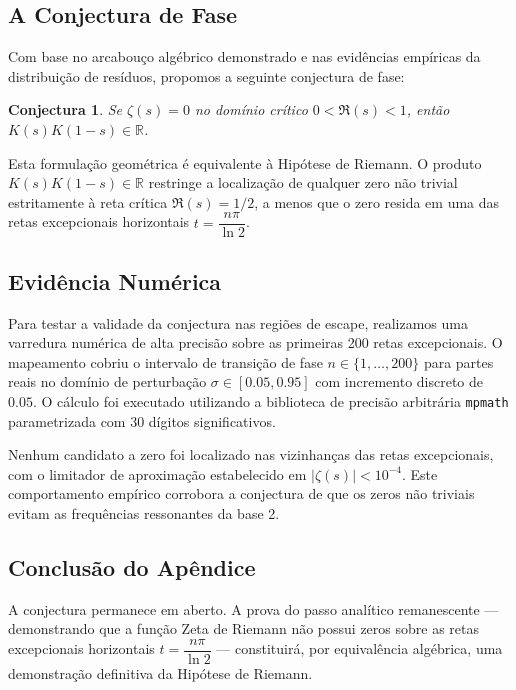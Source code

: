 \documentclass[12pt,a4paper]{article}
\theoremstyle{plain}
\newtheorem{conjecture}[theorem]{Conjectura}
\begin{document}
\subsection{A Conjectura de Fase}

Com base no arcabouço algébrico demonstrado e nas evidências empíricas
da distribuição de resíduos, propomos a seguinte conjectura de fase:

\begin{conjecture}
Se $\zeta(s) = 0$ no domínio crítico $0 < \mathfrak{R}(s) < 1$, então
$K(s)K(1-s) \in \mathbb{R}$.
\end{conjecture}

Esta formulação geométrica é equivalente à Hipótese de Riemann.  O
produto $K(s)K(1-s) \in \mathbb{R}$ restringe a localização de qualquer
zero não trivial estritamente à reta crítica $\mathfrak{R}(s) = 1/2$,
a menos que o zero resida em uma das retas excepcionais horizontais
$t = \dfrac{n\pi}{\ln 2}$.

\subsection{Evidência Numérica}

Para testar a validade da conjectura nas regiões de escape, realizamos
uma varredura numérica de alta precisão sobre as primeiras 200 retas
excepcionais.  O mapeamento cobriu o intervalo de transição de fase
$n \in \{1, \dots, 200\}$ para partes reais no domínio de perturbação
$\sigma \in [0.05, 0.95]$ com incremento discreto de $0.05$.  O cálculo
foi executado utilizando a biblioteca de precisão arbitrária
\texttt{mpmath} parametrizada com 30 dígitos significativos.

Nenhum candidato a zero foi localizado nas vizinhanças das retas
excepcionais, com o limitador de aproximação estabelecido em
$|\zeta(s)| < 10^{-4}$.  Este comportamento empírico corrobora a
conjectura de que os zeros não triviais evitam as frequências
ressonantes da base 2.

\subsection{Conclusão do Apêndice}

A conjectura permanece em aberto.  A prova do passo analítico
remanescente --- demonstrando que a função Zeta de Riemann não possui
zeros sobre as retas excepcionais horizontais
$t = \dfrac{n\pi}{\ln 2}$ --- constituirá, por equivalência algébrica,
uma demonstração definitiva da Hipótese de Riemann.
\end{document}
